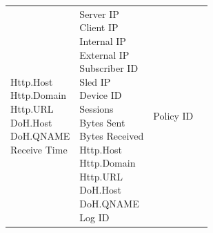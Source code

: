 \begin{description}
\begin{longtable}{p{}|p{}|p{}|p{}}
{                                                    Http.Host\\
                                                    Http.Domain\\
                                                    Http.URL\\
                                                    DoH.Host\\
                                                    DoH.QNAME\\
                                                    Receive Time}  & \tabincell{l}{Server IP\\
                                                                                    Client IP\\
                                                                                    Internal IP\\
                                                                                    External IP\\
                                                                                    Subscriber ID\\
                                                                                    Sled IP\\
                                                                                    Device ID\\
                                                                                    Sessions\\
                                                                                    Bytes Sent\\
                                                                                    Bytes Received\\
                                                                                    Http.Host\\
                                                                                    Http.Domain\\
                                                                                    Http.URL\\
                                                                                    DoH.Host\\
                                                                                    DoH.QNAME\\
                                                                                    Log ID}  & \tabincell{l}{Policy ID\\
}
\end{longtable}
\end{description}

